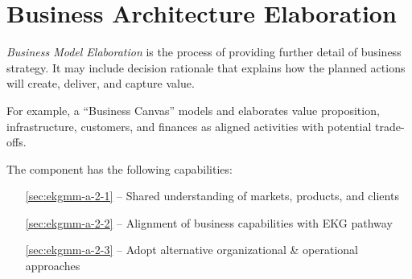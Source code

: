 \chapter{Business Architecture Elaboration}\label{ch:ekgmm-a-2} %

\textit{Business Model Elaboration} is the process of providing further detail of business strategy.
It may include decision rationale that explains how the planned actions will create, deliver, and capture value.

For example, a \enquote{Business Canvas} models and elaborates value proposition, infrastructure, customers,
and finances as aligned activities with potential trade-offs.

The  component has the following capabilities:

\begin{itemize}[leftmargin=.5in]
  \item [\ref{sec:ekgmm-a-2-1}]  -- Shared understanding of markets, products, and clients
  \item [\ref{sec:ekgmm-a-2-2}]  -- Alignment of business capabilities with EKG pathway
  \item [\ref{sec:ekgmm-a-2-3}]  -- Adopt alternative organizational \& operational approaches
\end{itemize}






